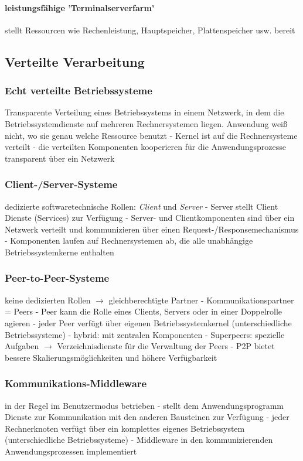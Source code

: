 \documentclass[10pt,a4paper,landscape]{article}
\begin{document}
\begin{multicols*}{3}
	\paragraph{leistungsfähige 'Terminalserverfarm'} stellt Ressourcen wie Rechenleistung, Hauptspeicher, Plattenspeicher usw. bereit
	\subsection{Verteilte Verarbeitung}
	\subsubsection{Echt verteilte Betriebssysteme}
	Transparente Verteilung eines Betriebssystems in einem Netzwerk, in dem die Betriebssystemdienste auf mehreren Rechnersystemen liegen. Anwendung weiß nicht, wo sie genau welche Ressource benutzt - Kernel ist auf die Rechnersysteme verteilt - die verteilten Komponenten kooperieren für die Anwendungsprozesse transparent über ein Netzwerk
	\subsubsection{Client-/Server-Systeme}
	dedizierte softwaretechnische Rollen: \textit{Client} und \textit{Server} - Server stellt Client Dienste (Services) zur Verfügung - Server- und Clientkomponenten sind über ein Netzwerk verteilt und kommunizieren über einen Request-/Responsemechanismus - Komponenten laufen auf Rechnersystemen ab, die alle unabhängige Betriebssystemkerne enthalten
	\subsubsection{Peer-to-Peer-Systeme}
	keine dedizierten Rollen $\rightarrow$ gleichberechtigte Partner - Kommunikationspartner = Peers - Peer kann die Rolle eines Clients, Servers oder in einer Doppelrolle agieren - jeder Peer verfügt über eigenen Betriebssystemkernel (unterschiedliche Betriebssysteme) - hybrid: mit zentralen Komponenten - Superpeers: spezielle Aufgaben $\rightarrow$ Verzeichnisdienste für die Verwaltung der Peers - P2P bietet bessere Skalierungsmöglichkeiten und höhere Verfügbarkeit
	\subsubsection{Kommunikations-Middleware}
	in der Regel im Benutzermodus betrieben - stellt dem Anwendungsprogramm Dienste zur Kommunikation mit den anderen Bausteinen zur Verfügung - jeder Rechnerknoten verfügt über ein komplettes eigenes Betriebssystem (unterschiedliche Betriebssysteme) - Middleware in den kommunizierenden Anwendungsprozessen implementiert

\end{multicols*}
\end{document}
